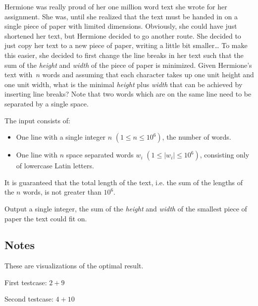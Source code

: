 
Hermione was really proud of her one million word text she wrote for her assignment.
She was, until she realized that the text must be handed in on a single piece of paper with limited dimensions.
Obviously, she could have just shortened her text, but Hermione decided to go another route.
She decided to just copy her text to a new piece of paper, writing a little bit smaller\dots
To make this easier, she decided to first change the line breaks in her text such that the sum of the \emph{height} and \emph{width} of the piece of paper is minimized.
Given Hermione's text with~$n$ words and assuming that each character takes up one unit height and one unit width, what is the minimal \emph{height} plus \emph{width} that can be achieved by inserting line breaks?
Note that two words which are on the same line need to be separated by a single space.

\begin{Input}
The input consists of:
\begin{itemize}
	\item One line with a single integer $n$ $(1\leq n\leq 10^6)$, the number of words.
	\item One line with $n$ space separated words $w_i$ $(1\leq |w_i|\leq 10^6)$, consisting only of lowercase Latin letters.
\end{itemize}
It is guaranteed that the total length of the text, i.e. the sum of the lengths of the $n$ words, is not greater than $10^6$.
\end{Input}

\begin{Output}
	Output a single integer, the sum of the \emph{height} and \emph{width} of the smallest piece of paper the text could fit on.
\end{Output}
\begin{afterSample}
	\clearpage
	\section*{Notes}
	These are visualizations of the optimal result.
	
	\begin{minipage}{\linewidth}
		First testcase: $2+9$
		
	\end{minipage}

	\begin{minipage}{\linewidth}
		Second testcase: $4+10$
		
	\end{minipage}
\end{afterSample}
